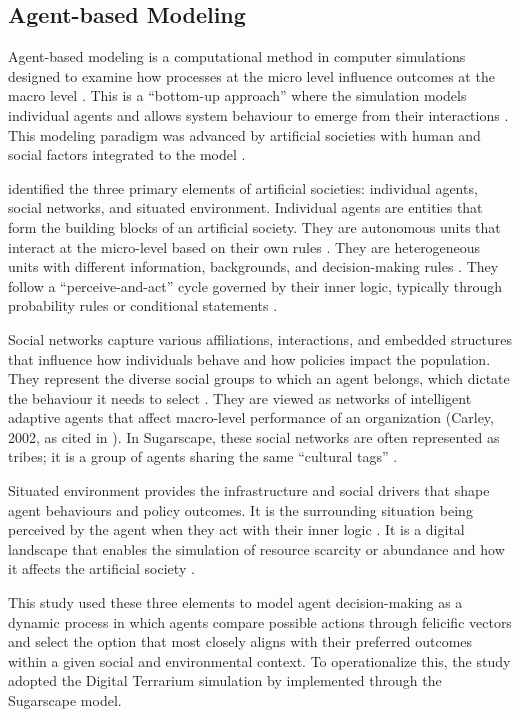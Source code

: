 \documentclass{icsthesis}
\begin{document}
\begin{mainmatter}
\subsection{Agent-based Modeling}
Agent-based modeling is a computational method in computer simulations designed to examine how processes at the micro level influence outcomes at the macro level \citep{Scalco2015}. This is a “bottom-up approach” where the simulation models individual agents and allows system behaviour to emerge from their interactions \citep{Kehoe2015}. This modeling paradigm was advanced by artificial societies with human and social factors integrated to the model  \citep{Tolk2022}.

\citet{Tolk2022} identified the three primary elements of artificial societies: individual agents, social networks, and situated environment.
Individual agents are entities that form the building blocks of an artificial society. They are autonomous units that interact at the micro-level based on their own rules \citep{KremerHerman2024}. They are heterogeneous units with different information, backgrounds, and decision-making rules \citep{Lempert2002}. They follow a “perceive-and-act” cycle governed by their inner logic, typically through probability rules or conditional statements \citep{Tolk2022}.

Social networks capture various affiliations, interactions, and embedded structures that influence how individuals behave and how policies impact the population. They represent the diverse social groups to which an agent belongs, which dictate the behaviour it needs to select  \citep{Tolk2022}.  They are viewed as networks of intelligent adaptive agents that affect macro-level performance of an organization (Carley, 2002, as cited in \citealt{Lempert2002}). In Sugarscape, these social networks are often represented as tribes; it is a group of agents sharing the same “cultural tags” \citep{KremerHerman2024}.

Situated environment provides the infrastructure and social drivers that shape agent behaviours and policy outcomes. It is the surrounding situation being perceived by the agent when they act with their inner logic \citep{Tolk2022}. It is a digital landscape that enables the simulation of resource scarcity or abundance and how it affects the artificial society \citep{KremerHerman2024}.

This study used these three elements to model agent decision-making as a dynamic process in which agents compare possible actions through felicific vectors and select the option that most closely aligns with their preferred outcomes within a given social and environmental context. To operationalize this, the study adopted the Digital Terrarium simulation by \citet{KremerHerman2024} implemented through the Sugarscape model.


\end{mainmatter}
\end{document}
